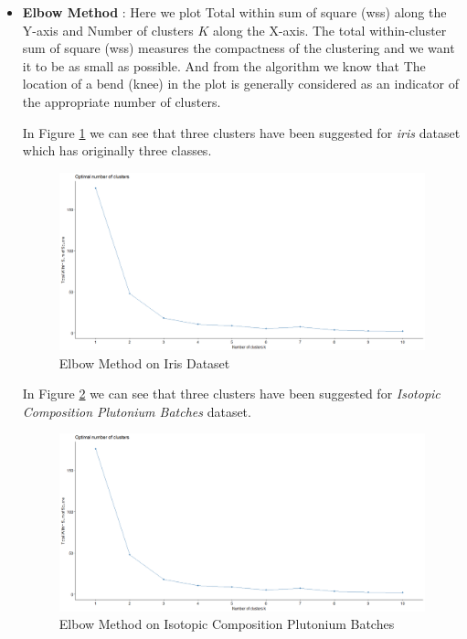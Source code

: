 \begin{itemize}
\item \textbf{Elbow Method} : Here we plot Total within sum of square (wss) along the Y-axis and
Number of clusters $K$ along the X-axis. The total within-cluster sum of square (wss) measures the compactness
of the clustering and we want it to be as small as possible. And from the algorithm we know that The location
of a bend (knee) in the plot is generally considered as an indicator of the appropriate number of clusters.

In Figure \ref{fig:elbow1} we can see that three clusters have been suggested for \textit{iris} dataset which
has originally three classes.

\begin{figure}[h!]
  \centering
  \includegraphics[scale=1.3]{figures/results/iris/elbow.png}
  \caption{Elbow Method on Iris Dataset}
  \label{fig:elbow1}
\end{figure}

\vspace{15mm}

In Figure \ref{fig:elbow2} we can see that three clusters have been suggested for \textit{Isotopic Composition Plutonium Batches}
dataset.

\begin{figure}[h!]
  \centering
  \includegraphics[scale=1.3]{figures/results/pluton/elbow.png}
  \caption{Elbow Method on Isotopic Composition Plutonium Batches}
  \label{fig:elbow2}
\end{figure}


\end{itemize}

